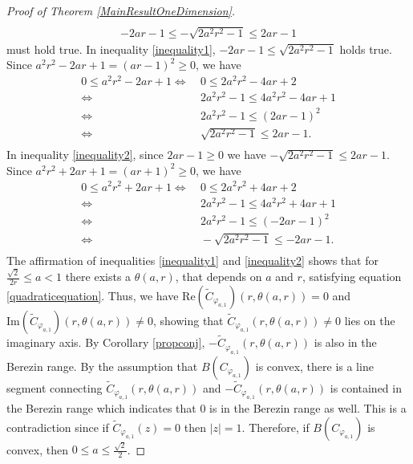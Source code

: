 \documentclass[10pt,a4paper]{amsart}
\begin{document}
\begin{proof}[Proof of Theorem \ref{MainResultOneDimension}]
\begin{align}
\end{align}
\begin{align}\label{inequality2}
-2ar-1 \leq - \sqrt{2a^2r^2-1} \leq 2ar-1    
\end{align}
must hold true.
\noindent In inequality \eqref{inequality1}, $-2ar-1 \leq \sqrt{2a^2r^2-1}$ holds true. Since $a^2r^2-2ar+1=(ar-1)^2 \geq 0$, we have
\begin{align*}
0 \leq a^2r^2-2ar+1  \Leftrightarrow&\  0 \leq 2a^2r^2-4ar+2  \\
\Leftrightarrow&\ 2a^2r^2-1 \leq 4a^2r^2-4ar+1  \\
\Leftrightarrow&\ 2a^2r^2-1 \leq (2ar-1)^2 \\
\Leftrightarrow&\ \sqrt{2a^2r^2-1} \leq 2ar-1. \\
\end{align*}
In inequality \eqref{inequality2}, since $2ar-1 \geq 0$ we have $- \sqrt{2a^2r^2-1} \leq 2ar-1$. Since $a^2r^2+2ar+1=(ar+1)^2 \geq 0$, we have
\begin{align*}
0 \leq a^2r^2+2ar+1 \Leftrightarrow&\ 0 \leq 2a^2r^2+4ar+2 \\
\Leftrightarrow&\ 2a^2r^2-1 \leq 4a^2r^2+4ar+1  \\
\Leftrightarrow&\ 2a^2r^2-1 \leq (-2ar-1)^2  \\
\Leftrightarrow&\ -\sqrt{2a^2r^2-1} \leq -2ar-1. \\
\end{align*}
The affirmation of inequalities \eqref{inequality1} and \eqref{inequality2} shows that for $\frac{\sqrt{2}}{2r} \leq a < 1$ there exists a $\theta(a,r)$, that depends on $a$ and $r$, satisfying equation \eqref{quadraticequation}. Thus, we have $\mathrm{Re}(\widetilde{C}_{\varphi_{a,1}})(r,\theta(a,r))=0$ and $\mathrm{Im}(\widetilde{C}_{\varphi_{a,1}})(r,\theta(a,r)) \neq 0$, showing that
$\widetilde{C}_{{\varphi}_{a,1}}(r,\theta(a,r))\neq 0$ lies on the imaginary axis. By Corollary \ref{propconj}, $-\widetilde{C}_{{\varphi}_{a,1}}(r,\theta(a,r))$ is also in the Berezin range.  By the assumption that $B(C_{\varphi_{a,1}})$ is convex, there is a line segment connecting $\widetilde{C}_{{\varphi}_{a,1}}(r,\theta(a,r))$ and $-\widetilde{C}_{{\varphi}_{a,1}}(r,\theta(a,r))$ is contained in the Berezin range which indicates that $0$ is in the Berezin range as well. This is a contradiction since if $\widetilde{C}_{{\varphi}_{a,1}}(z)=0$ then $|z|=1$. Therefore, if $B(C_{\varphi_{a,1}})$ is convex, then $0 \leq a \leq \frac{\sqrt{2}}{2}$.


\end{proof}
\end{document}

